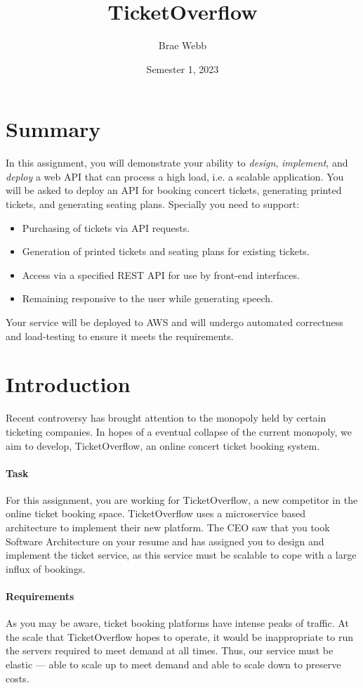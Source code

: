 \documentclass{csse4400}
\title{TicketOverflow}
\author{Brae Webb}
\date{Semester 1, 2023}
\begin{document}
\maketitle

\section*{Summary}
In this assignment, you will demonstrate your ability to \textsl{design},
\textsl{implement}, and \textsl{deploy} a web API that can process a high load,
i.e. a scalable application.
You will be asked to deploy an API for booking concert tickets,
generating printed tickets, and generating seating plans.
Specially you need to support:
\begin{itemize}
    \item Purchasing of tickets via API requests.
    \item Generation of printed tickets and seating plans for existing tickets.
    \item Access via a specified REST API for use by front-end interfaces.
    \item Remaining responsive to the user while generating speech.
\end{itemize}

Your service will be deployed to AWS and will undergo automated correctness and load-testing to ensure it meets the requirements.

\section{Introduction}
Recent controversy has brought attention to the monopoly held by certain ticketing companies.
In hopes of a eventual collapse of the current monopoly,
we aim to develop, TicketOverflow,
an online concert ticket booking system.

\paragraph{Task}
For this assignment,
you are working for TicketOverflow,
a new competitor in the online ticket booking space.
TicketOverflow uses a microservice based architecture to implement their new platform.
The CEO saw that you took Software Architecture on your resume and has assigned you to design and implement the ticket service,
as this service must be scalable to cope with a large influx of bookings.

\paragraph{Requirements}
As you may be aware,
ticket booking platforms have intense peaks of traffic.
At the scale that TicketOverflow hopes to operate,
it would be inappropriate to run the servers required to meet demand at all times.
Thus, our service must be elastic --- able to scale up to meet demand and able to scale down to preserve costs.
\end{document}
